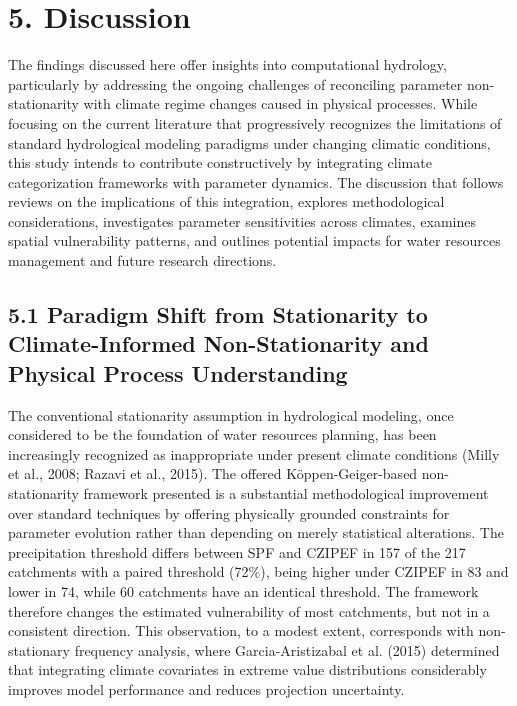 \documentclass[
]{article}
\begin{document}
\section{5. Discussion}\label{discussion}

The findings discussed here offer insights into computational hydrology,
particularly by addressing the ongoing challenges of reconciling
parameter non-stationarity with climate regime changes caused in
physical processes. While focusing on the current literature that
progressively recognizes the limitations of standard hydrological
modeling paradigms under changing climatic conditions, this study
intends to contribute constructively by integrating climate
categorization frameworks with parameter dynamics. The discussion that
follows reviews on the implications of this integration, explores
methodological considerations, investigates parameter sensitivities
across climates, examines spatial vulnerability patterns, and outlines
potential impacts for water resources management and future research
directions.

\subsection{5.1 Paradigm Shift from Stationarity to Climate-Informed
Non-Stationarity and Physical Process
Understanding}\label{paradigm-shift-from-stationarity-to-climate-informed-non-stationarity-and-physical-process-understanding}

The conventional stationarity assumption in hydrological modeling, once
considered to be the foundation of water resources planning, has been
increasingly recognized as inappropriate under present climate
conditions (Milly et al., 2008; Razavi et al., 2015). The offered
Köppen-Geiger-based non-stationarity framework presented is a
substantial methodological improvement over standard techniques by
offering physically grounded constraints for parameter evolution rather
than depending on merely statistical alterations. The precipitation
threshold differs between SPF and CZIPEF in 157 of the 217 catchments
with a paired threshold (72\%), being higher under CZIPEF in 83 and
lower in 74, while 60 catchments have an identical threshold. The
framework therefore changes the estimated vulnerability of most
catchments, but not in a consistent direction. This observation, to a
modest extent, corresponds with non-stationary frequency analysis, where
Garcia-Aristizabal et al. (2015) determined that integrating climate
covariates in extreme value distributions considerably improves model
performance and reduces projection uncertainty.
\end{document}
